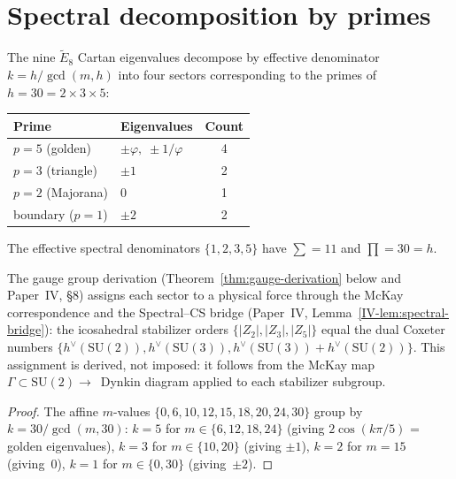 \section{Spectral decomposition by primes}
\label{sec:spectral-primes}

\begin{theorem}\label{thm:spectral-decomp}
The nine $\tilde{E}_8$ Cartan eigenvalues decompose by effective denominator
$k = h/\gcd(m,h)$ into four sectors corresponding to the primes of~$h = 30 = 2 \times 3 \times 5$:
\begin{center}
\begin{tabular}{llc}
Prime & Eigenvalues & Count \\
\hline
$p=5$ (golden)    & $\pm\varphi,\;\pm 1/\varphi$ & 4 \\
$p=3$ (triangle)  & $\pm 1$                       & 2 \\
$p=2$ (Majorana)  & $0$                           & 1 \\
boundary ($p=1$)  & $\pm 2$                        & 2 \\
\end{tabular}
\end{center}
The effective spectral denominators $\{1,2,3,5\}$ have
$\sum = 11$ and $\prod = 30 = h$.
\end{theorem}

\noindent
The gauge group derivation (Theorem~\ref{thm:gauge-derivation} below
and Paper~IV, \S8) assigns each sector to a physical force
through the McKay correspondence and the Spectral--CS bridge
(Paper~IV, Lemma~\ref*{IV-lem:spectral-bridge}):
the icosahedral stabilizer orders $\{|Z_2|, |Z_3|, |Z_5|\}$
equal the dual Coxeter numbers $\{h^\vee(\mathrm{SU}(2)),
h^\vee(\mathrm{SU}(3)), h^\vee(\mathrm{SU}(3)){+}h^\vee(\mathrm{SU}(2))\}$.
This assignment is derived, not imposed:
it follows from the McKay map
$\Gamma \subset \mathrm{SU}(2) \to$~Dynkin diagram
applied to each stabilizer subgroup.

\begin{proof}
The affine $m$-values $\{0,6,10,12,15,18,20,24,30\}$ group by
$k = 30/\gcd(m,30)$: $k=5$ for $m \in \{6,12,18,24\}$ (giving
$2\cos(k\pi/5)$ = golden eigenvalues), $k=3$ for $m \in \{10,20\}$
(giving $\pm 1$), $k=2$ for $m=15$ (giving~$0$), $k=1$ for $m \in \{0,30\}$
(giving~$\pm 2$).
\end{proof}

